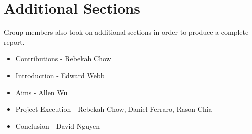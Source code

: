\section{Additional Sections}
Group members also took on additional sections in order to produce a complete report.

\begin{itemize}
    \item Contributions - Rebekah Chow
    \item Introduction - Edward Webb
    \item Aims - Allen Wu
    \item Project Execution - Rebekah Chow, Daniel Ferraro, Rason Chia
    \item Conclusion - David Nguyen
\end{itemize}